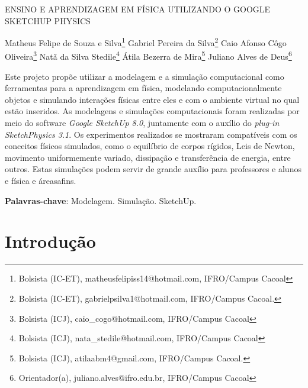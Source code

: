 \documentclass[article,12pt,onesidea,4paper,english,brazil]{abntex2}
\begin{document}
	
	
	\frenchspacing 
	
	\begin{center}
		\LARGE ENSINO E APRENDIZAGEM EM FÍSICA UTILIZANDO O GOOGLE SKETCHUP PHYSICS 
		
		\normalsize
		Matheus Felipe de Souza e Silva\footnote{Bolsista (IC-ET), matheusfelipiss14@hotmail.com, IFRO/Campus Cacoal} 
		Gabriel Pereira da Silva\footnote{Bolsista (IC-ET), gabrielpsilva1@hotmail.com, IFRO/Campus Cacoal.} 
		Caio Afonso Côgo Oliveira\footnote{Bolsista (ICJ), caio\_cogo@hotmail.com, IFRO/Campus Cacoal} 
	Natã da Silva Stedile\footnote{Bolsista (ICJ), nata\_stedile@hotmail.com, IFRO/Campus Cacoal} 
	Átila Bezerra de Mira\footnote{Bolsista (ICJ), atilaabm4@gmail.com, IFRO/Campus Cacoal.}
	Juliano Alves de Deus\footnote{Orientador(a), juliano.alves@ifro.edu.br, IFRO/Campus Cacoal}
	\end{center}
	
	\begin{resumoumacoluna}
		Este projeto propõe utilizar a modelagem e a simulação computacional como ferramentas para a aprendizagem em física, modelando computacionalmente objetos e simulando interações físicas entre eles e com o ambiente virtual no qual estão inseridos. As modelagens e simulações computacionais foram realizadas por meio do software\textit{ Google SketchUp 8.0}, juntamente com o auxílio do\textit{ plug-in SketchPhysics 3.1}. Os experimentos realizados se mostraram compatíveis com os conceitos físicos simulados, como o equilíbrio de corpos rígidos, Leis de Newton, movimento uniformemente variado, dissipação e transferência de energia, entre outros. Estas simulações podem servir de grande auxílio para professores e alunos  e física e áreasafins.
		
		\vspace{\onelineskip}
		
		\noindent
		\textbf{Palavras-chave}: Modelagem. Simulação. SketchUp.
	\end{resumoumacoluna}
	
	\section*{Introdução}
	
\end{document}
